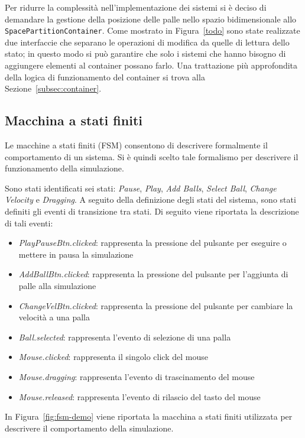 Per ridurre la complessità nell'implementazione dei sistemi si è deciso di demandare la gestione della posizione delle
palle nello spazio bidimensionale allo \texttt{SpacePartitionContainer}.
Come mostrato in Figura~\ref{todo} sono state realizzate due interfaccie che separano le operazioni di modifica da
quelle di lettura dello stato;
in questo modo si può garantire che solo i sistemi che hanno bisogno di aggiungere elementi al container possano farlo.
Una trattazione più approfondita della logica di funzionamento del container si trova alla Sezione~\ref{subsec:container}.

\subsection{Macchina a stati finiti}\label{subsec:macchina-a-stati-finiti}
Le macchine a stati finiti (FSM) consentono di descrivere formalmente il comportamento di un sistema.
Si è quindi scelto tale formalismo per descrivere il funzionamento della simulazione.

Sono stati identificati sei stati: \textit{Pause}, \textit{Play}, \textit{Add Balls}, \textit{Select Ball},
\textit{Change Velocity} e \textit{Dragging}.
A seguito della definizione degli stati del sistema, sono stati definiti gli eventi di transizione tra stati.
Di seguito viene riportata la descrizione di tali eventi:
\begin{itemize}
    \item \textit{PlayPauseBtn.clicked}: rappresenta la pressione del pulsante per eseguire o mettere in pausa la
    simulazione
    \item \textit{AddBallBtn.clicked}: rappresenta la pressione del pulsante per l'aggiunta di palle alla simulazione
    \item \textit{ChangeVelBtn.clicked}: rappresenta la pressione del pulsante per cambiare la velocità a una palla
    \item \textit{Ball.selected}: rappresenta l'evento di selezione di una palla
    \item \textit{Mouse.clicked}: rappresenta il singolo click del mouse
    \item \textit{Mouse.dragging}: rappresenta l'evento di trascinamento del mouse
    \item \textit{Mouse.released}: rappresenta l'evento di rilascio del tasto del mouse
\end{itemize}

In Figura~\ref{fig:fsm-demo} viene riportata la macchina a stati finiti utilizzata per descrivere il comportamento
della simulazione.

